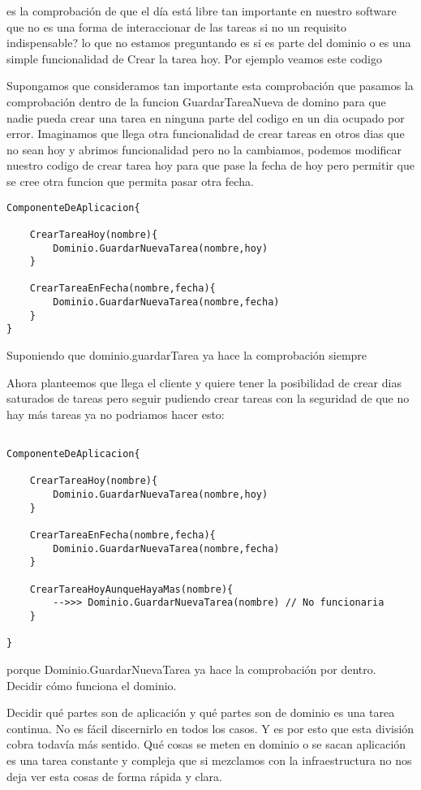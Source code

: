 es la comprobación de que el día está libre tan importante en nuestro software que no es una forma de interaccionar de las tareas
si no un requisito indispensable? lo que no estamos preguntando es si es parte del dominio o es una simple funcionalidad de Crear la tarea hoy. Por ejemplo veamos este codigo

Supongamos que consideramos tan importante esta comprobación que pasamos la comprobación dentro de la funcion GuardarTareaNueva de domino para que nadie pueda crear una tarea en ninguna parte del codigo en un dia ocupado por error. Imaginamos que llega otra funcionalidad de crear tareas en otros dias que no sean hoy y abrimos funcionalidad pero no la cambiamos, podemos modificar nuestro codigo de crear tarea hoy para que pase la fecha de hoy pero permitir que se cree otra funcion que permita pasar otra fecha.

\begin{verbatim}
ComponenteDeAplicacion{

    CrearTareaHoy(nombre){
        Dominio.GuardarNuevaTarea(nombre,hoy)
    }

    CrearTareaEnFecha(nombre,fecha){
        Dominio.GuardarNuevaTarea(nombre,fecha)
    }
}

\end{verbatim}

Suponiendo que dominio.guardarTarea ya hace la comprobación siempre


Ahora planteemos que llega el cliente y quiere tener la posibilidad de crear dias saturados de tareas pero seguir pudiendo crear tareas con la seguridad de que no hay más tareas ya no podriamos hacer esto:

\begin{verbatim}

ComponenteDeAplicacion{

    CrearTareaHoy(nombre){
        Dominio.GuardarNuevaTarea(nombre,hoy)
    }

    CrearTareaEnFecha(nombre,fecha){
        Dominio.GuardarNuevaTarea(nombre,fecha)
    }

    CrearTareaHoyAunqueHayaMas(nombre){
        -->>> Dominio.GuardarNuevaTarea(nombre) // No funcionaria
    }

}
\end{verbatim}

porque Dominio.GuardarNuevaTarea ya hace la comprobación por dentro. Decidir cómo funciona el dominio.

Decidir qué partes son de aplicación y qué partes son de dominio es una tarea continua. No es fácil discernirlo en todos los casos. Y es por esto que esta división cobra todavía más sentido. Qué cosas se meten en dominio o se sacan aplicación es una tarea constante y compleja que si mezclamos con la infraestructura no nos deja ver esta cosas de forma rápida y clara.


